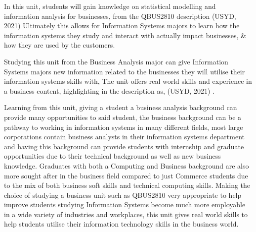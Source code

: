 In this unit, students will gain knowledge on statistical modelling and information analysis for businesses, from the QBUS2810 description  (USYD, 2021) Ultimately this allows for Information Systems majors to learn how the information systems they study and interact with actually impact businesses, & how they are used by the customers.

Studying this unit from the Business Analysis major can give Information Systems majors new information related to the businesses they will utilise their information systems skills with, The unit offers real world skills and experience in a business content, highlighting in the description as,  (USYD, 2021) .


Learning from this unit, giving a student a business analysis background can provide many opportunities to said student, the business background  can be a pathway to working in information systems in many different fields, most large corporations contain business analysts in their information systems department and having this background can provide students with internship and graduate opportunities due to their technical background as well as new business knowledge. Graduates with both a Computing and Business background are also more sought after in the business field compared to just Commerce students due to the mix of both business soft skills and technical computing skills. Making the choice of studying a business unit such as QBUS2810 very appropriate to help improve students studying Information Systems become much more employable in a wide variety of industries and workplaces, this unit gives real world skills to help students utilise their information technology skills in the business world.
